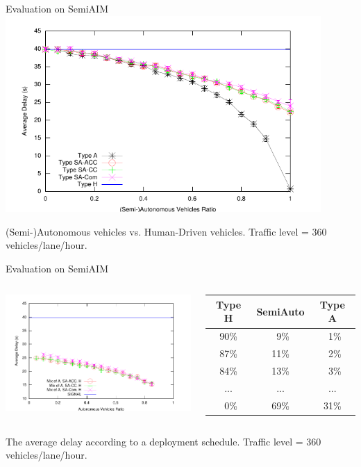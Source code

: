 \documentclass{beamer}
\begin{document}
\begin{frame}{Evaluation on SemiAIM}
\includegraphics[width=0.9\textwidth]{figures/figure_1.pdf}

(Semi-)Autonomous vehicles vs. Human-Driven vehicles. Traffic
level = 360 vehicles/lane/hour.
\end{frame}

\begin{frame}{Evaluation on SemiAIM}
\begin{columns}[c]
	\includegraphics[width=\columnwidth]{figures/figure_3.pdf}

	\small
	\begin{tabular}{|c|c|c|}
    \hline
    Type H&  SemiAuto &    Type A\\
    \hline
    90\% &      \ 9\% &   \ 1\% \\
    \hline
    87\% &     11\% &    \ 2\% \\
    \hline
    84\% &     13\% &    \ 3\% \\
    \hline
     ...&   ...&   ...\\
    \hline
    \ 0\%&     69\% &  31\% \\
    \hline
	\end{tabular}

\end{columns}

\hfill

The average delay according to a deployment schedule. Traffic level =
360 vehicles/lane/hour.
\end{frame}
\end{document}
